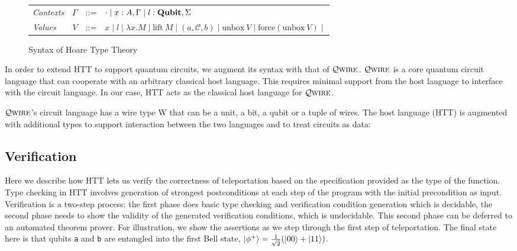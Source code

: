 \documentclass[acmsmall,nonacm,timestamp]{acmart}
\newcommand{\qwire}{\ensuremath{\mathcal{Q}\textsc{wire}}\xspace}
\newcommand{\type}[1]{\textrm{\textbf{#1}}}
\begin{document}
\begin{figure}[h]
\begin{tabular}{lrcl}
		\textit{Contexts} & $\Gamma$ & ::= & $ \cdot \mid x : A, \Gamma \mid l : \type{Qubit}, \Sigma$ \\
		\textit{Values} & $V$ & ::= & \begin{minipage}[t]{0.5\columnwidth}%
	$ x \mid l \mid \lambda x.M \mid \mathrm{lift}~M \mid (a, \mathcal{C}, b) \mid \mathrm{unbox}~V \mid \mathrm{force}(\mathrm{unbox}~V) \mid $
\end{minipage}\\
	\end{tabular}
	\caption{Syntax of Hoare Type Theory}
	\label{fig:syntax}
\end{figure}

In order to extend HTT to support quantum circuits, we augment its syntax with that of \qwire\cite{paykin_qwire:_2017,rand_formally_2018}. \qwire is a core quantum circuit language that can cooperate with an arbitrary classical host language. This requires minimal support from the host language to interface with the circuit language. In our case, HTT acts as the classical host language for \qwire.

\qwire's circuit language has a wire type W that can be a unit, a bit, a qubit or a tuple of wires. The host language (HTT) is augmented with additional types to support interaction between the two languages and to treat circuits as data:

\subsection{Verification}
Here we describe how HTT lets us verify the correctness of teleportation based on the specification provided as the type of the function. Type checking in HTT involves generation of strongest postconditions at each step of the program with the initial precondition as input. Verification is a two-step process: the first phase does basic type checking and verification condition generation which is decidable, the second phase needs to show the validity of the generated verification conditions, which is undecidable. This second phase can be deferred to an automated theorem prover. For illustration, we show the assertions as we step through the first step of teleportation. The final state here is that qubits \lstinline{a} and \lstinline{b} are entangled into the first Bell state, $\ket{\phi^+} = \frac{1}{\sqrt{2}}(\ket{00} + \ket{11})$.
\end{document}
